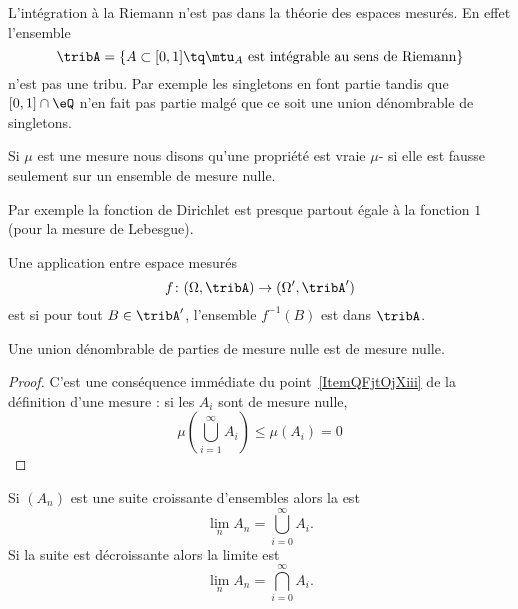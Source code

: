 \begin{example}
    L'intégration à la Riemann n'est pas dans la théorie des espaces mesurés. En effet l'ensemble
    \begin{equation}
        \tribA=\{   A\subset\mathopen[ 0 , 1 \mathclose]\tq   \mtu_A\text{ est intégrable au sens de Riemann}   \}
    \end{equation}
    n'est pas une tribu. Par exemple les singletons en font partie tandis que \( \mathopen[ 0 , 1 \mathclose]\cap \eQ\) n'en fait pas partie malgé que ce soit une union dénombrable de singletons.
\end{example}

\begin{definition}
    Si \( \mu\) est une mesure nous disons qu'une propriété est vraie \( \mu\)- si elle est fausse seulement sur un ensemble de mesure nulle.
\end{definition}

Par exemple la fonction de Dirichlet est presque partout égale à la fonction \( 1\) (pour la mesure de Lebesgue).

\begin{definition}
    Une application entre espace mesurés
    \begin{equation}
        f\colon (\Omega,\tribA)\to (\Omega',\tribA')
    \end{equation}
    est  si pour tout \( B\in\tribA'\), l'ensemble \( f^{-1}(B)\) est dans \( \tribA\).
\end{definition}

\begin{lemma}   \label{LemIDITgAy}
    Une union dénombrable de parties de mesure nulle est de mesure nulle.
\end{lemma}

\begin{proof}
    C'est une conséquence immédiate du point~\ref{ItemQFjtOjXiii} de la définition d'une mesure : si les \( A_i\) sont de mesure nulle,
    \begin{equation}
        \mu\left( \bigcup_{i=1}^{\infty}A_i \right)\leq \mu(A_i)=0
    \end{equation}
\end{proof}

\begin{definition}
    Si \( (A_n)\) est une suite croissante d'ensembles alors la  est
    \begin{equation}
        \lim_nA_n=\bigcup_{i=0}^{\infty}A_i.
    \end{equation}
    Si la suite est décroissante alors la limite est
    \begin{equation}
        \lim_nA_n=\bigcap_{i=0}^{\infty}A_i.
    \end{equation}
\end{definition}

